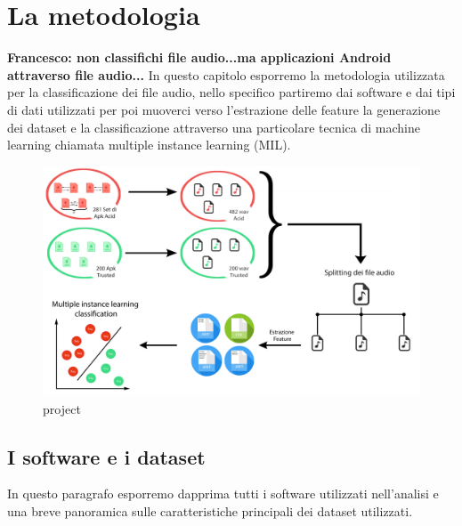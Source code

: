 \chapter{La metodologia}
\label{chap:cap4}
\textbf{Francesco: non classifichi file audio...ma applicazioni Android attraverso file audio...}
In questo capitolo esporremo la metodologia utilizzata per la classificazione dei file audio, nello specifico partiremo dai software e dai tipi di dati utilizzati per poi muoverci verso l'estrazione delle feature la generazione dei dataset e la classificazione attraverso una particolare tecnica di machine learning chiamata multiple instance learning (MIL). 
\begin{figure}[h]
\centering
    \includegraphics[width=0.9\linewidth]{imgs/capitolo4/all.png} 
    \caption{project}
    \label{fig:all}
\end{figure}
\FloatBarrier
\section{I software e i dataset}
In questo paragrafo esporremo dapprima tutti i software utilizzati nell'analisi e una breve panoramica sulle caratteristiche principali dei dataset utilizzati.  

